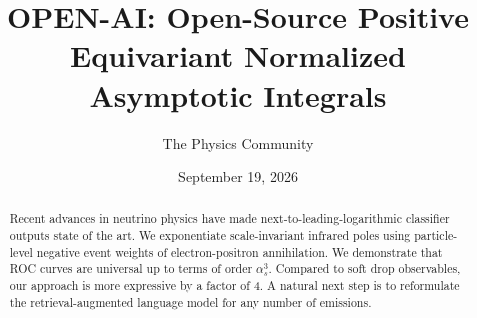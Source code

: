 \documentclass[11pt]{article}
\title{OPEN-AI: Open-Source Positive Equivariant Normalized Asymptotic Integrals}
\author{The Physics Community}
\date{September 19, 2026}
\numberwithin{equation}{section}
\theoremstyle{definition}
\theoremstyle{remark}
\begin{document}
\maketitle
\begin{abstract}
Recent advances in neutrino physics have made
next-to-leading-logarithmic classifier outputs state of the art. We
exponentiate scale-invariant infrared poles using particle-level
negative event weights of electron-positron annihilation. We demonstrate
that ROC curves are universal up to terms of order $\alpha_s^3$.
Compared to soft drop observables, our approach is more expressive by a
factor of 4. A natural next step is to reformulate the
retrieval-augmented language model for any number of emissions.
\end{abstract}
\tableofcontents





\nocite{*}


\end{document}
